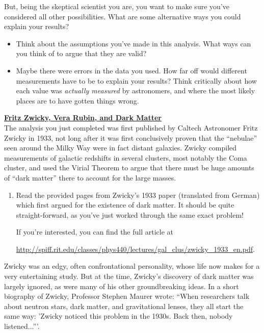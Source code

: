 \documentclass[11pt]{article}
\renewcommand{\section}[1]{\textbf{\underline{#1}}}
\begin{document}
\begin{enumerate}
\begin{enumerate}
    But, being the skeptical scientist you are, you want to make sure
    you've considered all other possibilities. What are some
    alternative ways you could explain your results?

    \begin{itemize}
    \item
      Think about the assumptions you've made in this analysis. What
      ways can you think of to argue that they are valid?
    \item
      Maybe there were errors in the data you used. How far off would
      different measurements have to be to explain your results? Think critically
      about how each value was \textit{actually measured} by
      astronomers, and where the most likely places are to have gotten
      things wrong.
    \end{itemize}
  \end{enumerate}
\end{enumerate}  

\section{Fritz Zwicky, Vera Rubin, and Dark Matter}\\

The analysis you just completed was first published by Caltech
Astronomer Fritz Zwicky in 1933, not long after it was first
conclusively proven that the ``nebulae'' seen around the Milky Way
were in fact distant galaxies. Zwicky compiled measurements of
galactic redshifts in several clusters, most notably the Coma cluster,
and used the Virial Theorem to argue that there must be huge amounts
of ``dark matter'' there to account for the large masses.

\begin{enumerate}[resume]
\item
  Read the provided pages from Zwicky's 1933 paper (translated from
  German) which first argued for the existence of dark matter. It
  should be quite straight-forward, as you've just worked through the
  same exact problem!

  If you're interested, you can find the full article at

  \href{http://spiff.rit.edu/classes/phys440/lectures/gal\_clus/zwicky\_1933\_en.pdf}{http://spiff.rit.edu/classes/phys440/lectures/gal\_clus/zwicky\_1933\_en.pdf}.
\end{enumerate}

Zwicky was an edgy, often confrontational personality, whose life now
makes for a very entertaining study. But at the time, Zwicky's
discovery of dark matter was largely ignored, as were many of his
other groundbreaking ideas. In a short biography of Zwicky, Professor
Stephen Maurer wrote: ``When researchers talk about neutron stars,
dark matter, and gravitational lenses, they all start the same way:
'Zwicky noticed this problem in the 1930s. Back then, nobody
listened...'''.
\end{document}
